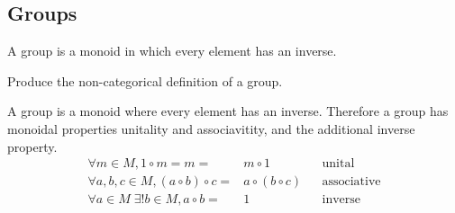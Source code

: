 \subsection{Groups}
\begin{definition}
	A group is a monoid in which every element has an inverse.
\end{definition}

\begin{ttta}
	Produce the non-categorical definition of a group.
\end{ttta}
A group is a monoid where every element has an inverse. Therefore a group has
monoidal properties unitality and associavitity, and the additional inverse
property.
\begin{align*}
	\forall m \in       M, 1\circ m =                     m = & m \circ 1           &  & \text{unital}      \\
	\forall a, b, c \in M, (a\circ b)\circ c =                & a \circ (b \circ c) &  & \text{associative} \\
	\forall a\in        M\; \exists! b\in M,  a\circ b =      & 1                   &  & \text{inverse}
\end{align*}

